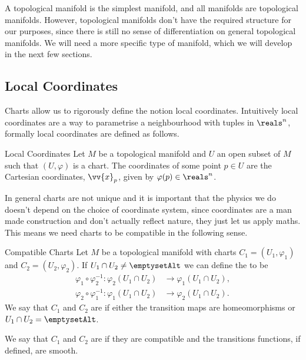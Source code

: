 \documentclass[fleqn]{NotesClass}
\begin{document}
    A topological manifold is the simplest manifold, and all manifolds are topological manifolds.
    However, topological manifolds don't have the required structure for our purposes, since there is still no sense of differentiation on general topological manifolds.
    We will need a more specific type of manifold, which we will develop in the next few sections.
    
    \subsection{Local Coordinates}
    Charts allow us to rigorously define the notion local coordinates.
    Intuitively local coordinates are a way to parametrise a neighbourhood with tuples in \(\reals^n\), formally local coordinates are defined as follows.
    
    \begin{dfn}{Local Coordinates}{}
        Let \(M\) be a topological manifold and \(U\) an open subset of \(M\) such that \((U, \varphi)\) is a chart.
        The coordinates of some point \(p \in U\) are the Cartesian coordinates, \(\vv{x}_p\), given by \(\varphi(p) \in \reals^n\).
    \end{dfn}
    
    In general charts are not unique and it is important that the physics we do doesn't depend on the choice of coordinate system, since coordinates are a man made construction and don't actually reflect nature, they just let us apply maths.
    This means we need charts to be compatible in the following sense.
    
    \begin{dfn}{Compatible Charts}{}
        Let \(M\) be a topological manifold with charts \(C_1 = (U_1, \varphi_1)\) and \(C_2 = (U_2, \varphi_2)\).
        If \(U_1 \cap U_2 \ne \emptysetAlt\) we can define the  to be
        \begin{align}
            \varphi_1 \circ \varphi_2^{-1} \colon \varphi_2(U_1 \cap U_2) &\to \varphi_1(U_1 \cap U_2),\\
            \varphi_2 \circ \varphi_1^{-1} \colon \varphi_1(U_1 \cap U_2) &\to \varphi_2(U_1 \cap U_2).
        \end{align}
        We say that \(C_1\) and \(C_2\) are  if either the transition maps are homeomorphisms or \(U_1 \cap U_2 = \emptysetAlt\).
        
        We say that \(C_1\) and \(C_2\) are  if they are compatible and the transitions functions, if defined, are smooth.
    \end{dfn}
    
\end{document}
